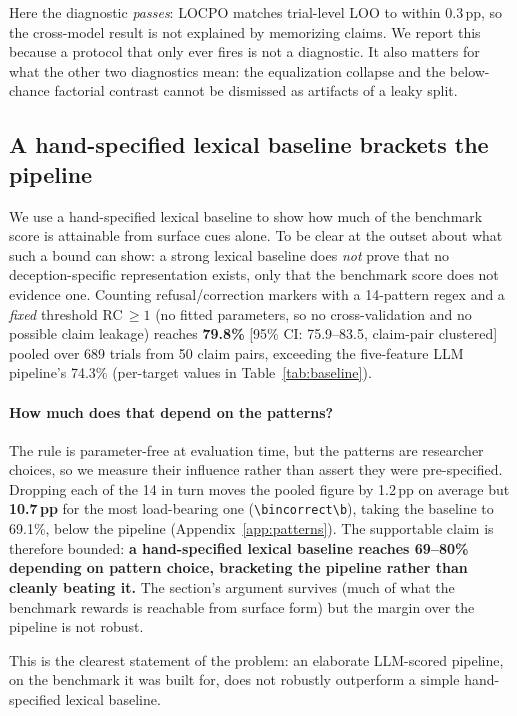 Here the diagnostic \emph{passes}: LOCPO matches trial-level LOO to within 0.3\,pp, so the cross-model result is not explained by memorizing claims. We report this because a protocol that only ever fires is not a diagnostic. It also matters for what the other two diagnostics mean: the equalization collapse and the below-chance factorial contrast cannot be dismissed as artifacts of a leaky split.

\subsection{A hand-specified lexical baseline brackets the pipeline}
\label{sec:baseline}

We use a hand-specified lexical baseline to show how much of the benchmark score is attainable from surface cues alone. To be clear at the outset about what such a bound can show: a strong lexical baseline does \emph{not} prove that no deception-specific representation exists, only that the benchmark score does not evidence one. Counting refusal/correction markers with a 14-pattern regex and a \emph{fixed} threshold RC$\,\geq\!1$ (no fitted parameters, so no cross-validation and no possible claim leakage) reaches \textbf{79.8\%} [95\% CI: 75.9--83.5, claim-pair clustered] pooled over 689 trials from 50 claim pairs, exceeding the five-feature LLM pipeline's 74.3\% (per-target values in Table~\ref{tab:baseline}).

\paragraph{How much does that depend on the patterns?} The rule is parameter-free at evaluation time, but the patterns are researcher choices, so we measure their influence rather than assert they were pre-specified. Dropping each of the 14 in turn moves the pooled figure by 1.2\,pp on average but \textbf{10.7\,pp} for the most load-bearing one (\texttt{\textbackslash bincorrect\textbackslash b}), taking the baseline to 69.1\%, below the pipeline (Appendix~\ref{app:patterns}). The supportable claim is therefore bounded: \textbf{a hand-specified lexical baseline reaches 69--80\% depending on pattern choice, bracketing the pipeline rather than cleanly beating it.} The section's argument survives (much of what the benchmark rewards is reachable from surface form) but the margin over the pipeline is not robust.

This is the clearest statement of the problem: an elaborate LLM-scored pipeline, on the benchmark it was built for, does not robustly outperform a simple hand-specified lexical baseline.
